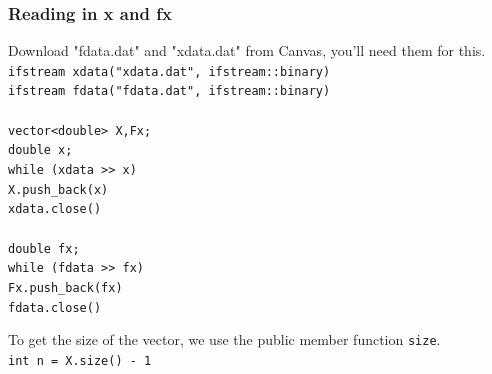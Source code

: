 \documentclass{if-beamer}
\begin{document}
\begin{frame}
	\frametitle{Reading in x and fx}
	Download "fdata.dat" and "xdata.dat" from Canvas, you'll need them for this. \\\vspace{10pt}
%	
	\texttt{ifstream xdata("xdata.dat", ifstream::binary)} \\ 
	\texttt{ifstream fdata("fdata.dat", ifstream::binary)} \\
	\texttt{ }\\
	\texttt{vector<double> X,Fx;}
	\texttt{ }\\
	\texttt{double x;}\\
	\texttt{while (xdata >> x)}\\	
	\texttt{\qquad X.push\_back(x)}\\
	\texttt{xdata.close()}\\	
	\texttt{ }\\
	\texttt{double fx;}\\
	\texttt{while (fdata >> fx)}\\	
	\texttt{\qquad Fx.push\_back(fx)}\\	
	\texttt{fdata.close()}\\\vspace{10pt}
	
	To get the size of the vector, we use the public member function \texttt{size}. \\\vspace{10pt}
	\texttt{int n = X.size() - 1}\\	
\end{frame}
\end{document}
